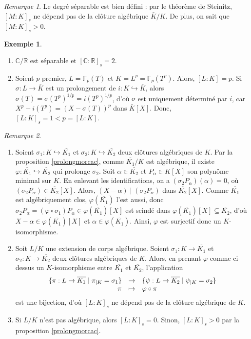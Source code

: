 \documentclass{article}
\newcommand{\R}{\mathbb{R}}
\newcommand{\C}{\mathbb{C}}
\newcommand{\F}{\mathbb{F}}
\newcommand{\applic}[4]{\begin{array}[t]{rcl}
#1 & \to & #2 \\
#3 & \mapsto & #4
\end{array}}
\theoremstyle{plain}
\theoremstyle{definition}
\newtheorem{example}[theorem]{Exemple}
\theoremstyle{remark}
\newtheorem*{remark}{Remarque}
\begin{document}
\begin{remark}
    Le degré séparable est bien défini : par le théorème de Steinitz, $[M : K]_s$ ne dépend pas de la clôture algébrique $\overline{K}/K$. De plus, on sait que $[M : K]_s > 0$.
\end{remark}

\begin{example} \leavevmode
    \begin{enumerate}
        \item $\C/\R$ est séparable et $[\C : \R]_s = 2$.
        \item Soient $p$ premier, $L = \F_p (T)$ et $K = L^p = \F_p(T^p)$. Alors, $[L : K] = p$. Si $\sigma : L \to \overline{K}$ est un prolongement de $i : K \hookrightarrow \overline{K}$, alors $\sigma(T) = \sigma(T^p)^{1/p} = i(T^p)^{1/p}$, d'où $\sigma$ est uniquement déterminé par $i$, car $X^p - i(T^p) = (X-\sigma(T))^p$ dans $\overline{K}[X]$. Donc, $[L:K]_s = 1 < p = [L:K]$.
    \end{enumerate}
\end{example}

\begin{remark} \leavevmode
    \begin{enumerate}
        \item Soient $\sigma_1 : K \hookrightarrow \overline{K_1}$ et $\sigma_2 : K \hookrightarrow \overline{K_2}$ deux clôtures algébriques de $K$. Par la proposition \ref{prolongmorcac}, comme $\overline{K_1}/K$ est algébrique, il existe $\varphi : \overline{K_1} \hookrightarrow \overline{K_2}$ qui prolonge $\sigma_2$. Soit $\alpha \in \overline{K_2}$ et $P_\alpha \in K[X]$ son polynôme minimal sur $K$. En enlevant les identifications, on a $(\sigma_2 P_\alpha) (\alpha) = 0$, où $(\sigma_2 P_\alpha) \in \overline{K_2} [X]$. Alors, $(X-\alpha) \mid (\sigma_2 P_\alpha)$ dans $\overline{K_2}[X]$. Comme $\overline{K_1}$ est algébriquement clos, $\varphi(\overline{K_1})$ l'est aussi, donc $\sigma_2 P_\alpha = (\varphi \circ \sigma_1) P_\alpha \in \varphi(\overline{K_1})[X]$ est scindé dans $\varphi(\overline{K_1})[X] \subseteq \overline{K_2}$, d'où $X-\alpha \in \varphi(\overline{K_1})[X]$ et $\alpha \in \varphi(\overline{K_1})$. Ainsi, $\varphi$ est surjectif donc un $K$-isomorphisme.
        \item Soit $L/K$ une extension de corps algébrique. Soient $\sigma_1 : K \to \overline{K_1}$ et $\sigma_2 : K \to \overline{K_2}$ deux clôtures algébriques de $K$. Alors, en prenant $\varphi$ comme ci-dessus un $K$-isomorphisme entre $\overline{K_1}$ et $\overline{K_2}$, l'application
        \[\applic{\{\pi : L \to \overline{K_1} \mid \pi_{\mid K} = \sigma_1\}}{\{\psi : L \to \overline{K_2} \mid \psi_{\mid K} = \sigma_2\}}{\pi}{\varphi \circ \pi}\]
        est une bijection, d'où $[L : K]_s$ ne dépend pas de la clôture algébrique de $K$.
        \item Si $L/K$ n'est pas algébrique, alors $[L : K]_s = 0$. Sinon, $[L : K]_s > 0$ par la proposition \ref{prolongmorcac}.
    \end{enumerate}
\end{remark}
\end{document}
